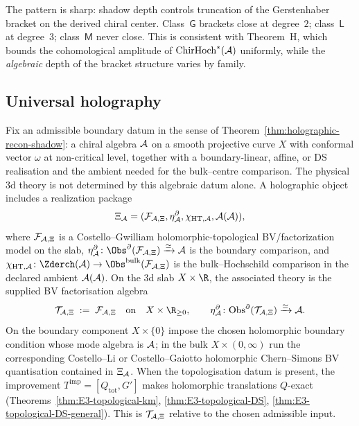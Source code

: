 \begin{remark}
The pattern is sharp: shadow depth controls truncation of the
Gerstenhaber bracket on the derived chiral center.
Class~$\mathsf{G}$ brackets close at degree~$2$;
class~$\mathsf{L}$ at degree~$3$;
class~$\mathsf{M}$ never close.
This is consistent with Theorem~H, which bounds the cohomological
amplitude of $\operatorname{ChirHoch}^*(\mathcal{A})$ uniformly, while the
\emph{algebraic} depth of the bracket structure varies by family.
\end{remark}


\subsection{Universal holography}\label{subsec:universal-holography}

Fix an admissible boundary datum in the sense of
Theorem~\ref{thm:holographic-recon-shadow}: a chiral algebra $\mathcal{A}$ on a
smooth projective curve $X$ with conformal vector $\omega$ at
non-critical level, together with a boundary-linear, affine, or DS
realisation and the ambient needed for the bulk--centre comparison.
The physical $3$d theory is not determined by this algebraic datum
alone.  A holographic object includes a realization package
\[
\Xi_{\mathcal{A}}=(\mathcal F_{\mathcal{A},\Xi},\eta^\partial_{\mathcal{A}},
\chi_{\mathrm{HT},\mathcal{A}},\mathcal A(\mathcal{A})),
\]
where $\mathcal F_{\mathcal{A},\Xi}$ is a Costello--Gwilliam
holomorphic-topological BV/factorization model on the slab,
\(\eta^\partial_{\cA}\colon
\Obs^\partial(\mathcal F_{\cA,\Xi})\xrightarrow{\simeq}\cA\)
is the boundary comparison, and
\(\chi_{\mathrm{HT},\cA}\colon
\Zderch(\cA)\to\Obs^{\mathrm{bulk}}(\mathcal F_{\cA,\Xi})\)
is the bulk--Hochschild comparison in the declared ambient
\(\mathcal A(\mathcal{A})\).  On the $3$d slab $X\times\R$, the associated
theory is the supplied BV factorisation algebra
\begin{equation}\label{eq:universal-holography-construction}
\mathcal{T}_{\cA,\Xi}
\;:=\;
\mathcal F_{\cA,\Xi}
\quad\text{on}\quad X\times\R_{\ge0},
\qquad
\eta^\partial_\cA\colon
\mathrm{Obs}^{\partial}(\mathcal{T}_{\cA,\Xi})
\xrightarrow{\simeq}\cA .
\end{equation}
On the boundary component $X\times\{0\}$ impose the chosen holomorphic
boundary condition whose mode algebra is $\mathcal{A}$; in the bulk
$X\times(0,\infty)$ run the corresponding Costello--Li or
Costello--Gaiotto holomorphic Chern--Simons BV quantisation contained
in \(\Xi_{\mathcal{A}}\). When the
topologisation datum is present, the improvement
$T^{\mathrm{imp}}=[Q_{\mathrm{tot}},G']$ makes holomorphic translations
$Q$-exact
(Theorems~\ref{thm:E3-topological-km},
\ref{thm:E3-topological-DS},
\ref{thm:E3-topological-DS-general}).
This is $\mathcal{T}_{\mathcal{A},\Xi}$ relative to the chosen admissible input.

